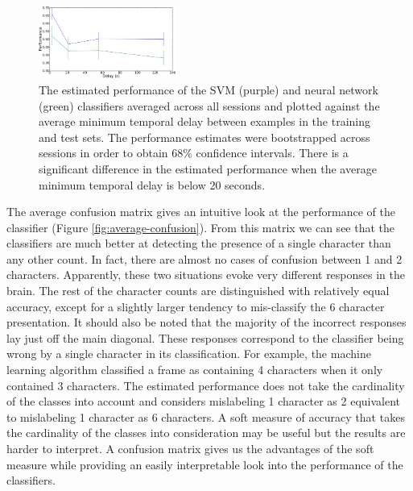 \documentclass[preprint,5p,authoryear]{elsarticle}
\begin{document}
\begin{figure}
\centering
\includegraphics[width=0.4\textwidth]{figures/performance-verse-temporal-distance}
\caption{The estimated performance of the SVM (purple) and neural network (green) classifiers averaged across all sessions and plotted against the average minimum temporal delay between examples in the training and test sets. 
The performance estimates were bootstrapped across sessions in order to obtain 68\% confidence intervals.
There is a significant difference in the estimated performance when the average minimum temporal delay is below 20 seconds.}
\label{fig:performance-verse-temporal-distance}
\end{figure}




The average confusion matrix gives an intuitive look at the performance of the classifier (Figure \ref{fig:average-confusion}).
From this matrix we can see that the classifiers are much better at detecting the presence of a single character than any other count.
In fact, there are almost no cases of confusion between 1 and 2 characters.
Apparently, these two situations evoke very different responses in the brain.
The rest of the character counts are distinguished with relatively equal accuracy,
except for a slightly larger tendency to mis-classify the 6 character presentation.
It should also be noted that the majority of the incorrect responses lay just off the main diagonal.
These responses correspond to the classifier being wrong by a single character in its classification.
For example, the machine learning algorithm classified a frame as containing 4 characters when it only contained 3 characters.
The estimated performance does not take the cardinality of the classes into account and considers mislabeling 1 character as 2 equivalent to mislabeling 1 character as 6 characters.
A soft measure of accuracy that takes the cardinality of the classes into consideration may be useful but the results are harder to interpret.
A confusion matrix gives us the advantages of the soft measure while providing an easily interpretable look into the performance of the classifiers.
\end{document}
